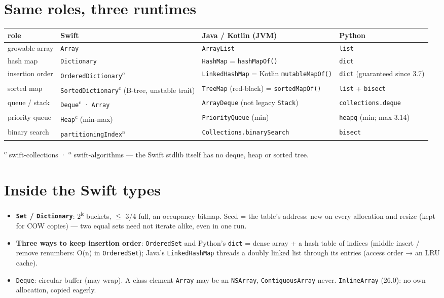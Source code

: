 \documentclass[8pt]{extarticle}
\newcommand\ct[1]{\texttt{#1}}
\begin{document}
\begin{multicols}{2}
\section{Same roles, three runtimes}
{\scriptsize\setlength{\tabcolsep}{1.5pt}
\begin{tabular}{@{}>{\raggedright\arraybackslash}p{12mm}>{\raggedright\arraybackslash}p{20mm}>{\raggedright\arraybackslash}p{25mm}>{\raggedright\arraybackslash}p{19mm}@{}}
\toprule
\textbf{role} & \textbf{Swift} & \textbf{Java / Kotlin (JVM)} & \textbf{Python}\\
\midrule
growable array & \ct{Array} & \ct{ArrayList} & \ct{list}\\
hash map & \ct{Dictionary} & \ct{HashMap} = \ct{hashMapOf()} & \ct{dict}\\
insertion order & \ct{OrderedDictionary}\textsuperscript{c} & \ct{LinkedHashMap} = Kotlin \ct{mutableMapOf()} & \ct{dict} (guaranteed since 3.7)\\
sorted map & \ct{SortedDictionary}\textsuperscript{c} (B-tree, unstable trait) & \ct{TreeMap} (red-black) = \ct{sortedMapOf()} & \ct{list} + \ct{bisect}\\
queue / stack & \ct{Deque}\textsuperscript{c} · \ct{Array} & \ct{ArrayDeque} (not legacy \ct{Stack}) & \ct{collections.deque}\\
priority queue & \ct{Heap}\textsuperscript{c} (min-max) & \ct{PriorityQueue} (min) & \ct{heapq} (min; max 3.14)\\
binary search & \ct{partitioningIndex}\textsuperscript{a} & \ct{Collections.binarySearch} & \ct{bisect}\\
\bottomrule
\end{tabular}}\par
{\scriptsize \textsuperscript{c} swift-collections · \textsuperscript{a} swift-algorithms — the
Swift stdlib itself has no deque, heap or sorted tree.}

\section{Inside the Swift types}
\begin{itemize}
  \item \textbf{\ct{Set} / \ct{Dictionary}}: 2\textsuperscript{k} buckets, $\le$ 3/4 full, an
        occupancy bitmap. Seed = the table's address: new on every allocation and resize
        (kept for COW copies) — two equal sets need not iterate alike, even in one run.
  \item \textbf{Three ways to keep insertion order}: \ct{OrderedSet} and Python's \ct{dict}
        = dense array + a hash table of indices (middle insert / remove renumbers: O(n) in
        \ct{OrderedSet}); Java's \ct{LinkedHashMap} threads a doubly linked list through
        its entries (access order → an LRU cache).
  \item \ct{Deque}: circular buffer (may wrap). A class-element \ct{Array} may be an
        \ct{NSArray}, \ct{ContiguousArray} never. \ct{InlineArray} (26.0): no own allocation, copied eagerly.
\end{itemize}


\end{multicols}
\end{document}
